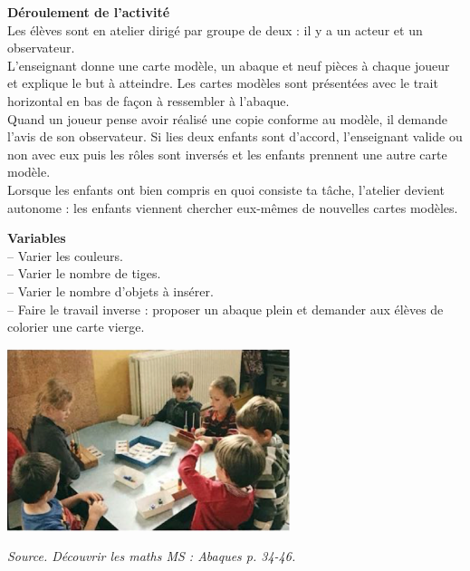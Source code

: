 \begin{exercice*}
{\bf Déroulement de l'activité} \\
Les élèves sont en atelier dirigé par groupe de deux : il y a un acteur et un observateur. \\
L'enseignant donne une carte modèle, un abaque et neuf pièces à chaque joueur et explique le but à atteindre. Les cartes modèles sont présentées avec le trait horizontal en bas de façon à ressembler à l'abaque. \\
Quand un joueur pense avoir réalisé une copie conforme au modèle, il demande l’avis de son observateur. Si lies deux enfants sont d'accord, l'enseignant valide ou non avec eux puis les rôles sont inversés et les enfants prennent une autre carte modèle. \\
Lorsque les enfants ont bien compris en quoi consiste ta tâche, l'atelier devient autonome : les enfants viennent chercher eux-mêmes de nouvelles cartes modèles. \medskip

{\bf Variables} \\
-- Varier les couleurs. \\
-- Varier le nombre de tiges. \\
-- Varier le nombre d'objets à insérer. \\
-- Faire le travail inverse : proposer un abaque plein et demander aux élèves de colorier une carte vierge.

\begin{center}
   \includegraphics[width=8.25cm]{Geometrie_did/Images/Geo6_activites_abaques_tiges4}
\end{center}

\hfill{\it\small Source. Découvrir les maths MS : Abaques p. 34-46.}
\end{exercice*}


